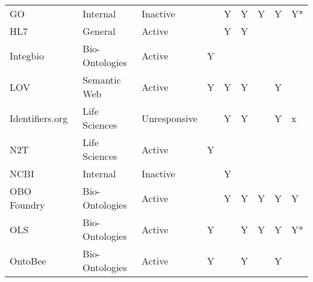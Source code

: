 \begin{table}
\begin{tabular}{lllllllll}
GO~\cite{TheGeneOntologyConsortium2019} &        Internal &     Inactive &                           &                      Y &                              Y &                      Y &                    Y &                     Y* \\
                  HL7~\cite{Bender2013} &         General &       Active &                           &                      Y &                              Y &                        &                      &                        \\
                               Integbio &  Bio-Ontologies &       Active &                         Y &                        &                                &                        &                      &                        \\
                                    LOV &    Semantic Web &       Active &                         Y &                      Y &                              Y &                        &                    Y &                        \\
        Identifiers.org~\cite{Juty2012} &   Life Sciences & Unresponsive &                           &                      Y &                              Y &                        &                    Y &                      x \\
             N2T~\cite{Wimalaratne2018} &   Life Sciences &       Active &                         Y &                        &                                &                        &                      &                        \\
                  NCBI~\cite{Clark2016} &        Internal &     Inactive &                           &                      Y &                                &                        &                      &                        \\
         OBO Foundry~\cite{Jackson2021} &  Bio-Ontologies &       Active &                           &                      Y &                              Y &                      Y &                    Y &                      Y \\
                   OLS~\cite{Cote2006a} &  Bio-Ontologies &       Active &                         Y &                        &                              Y &                      Y &                    Y &                     Y* \\
                 OntoBee~\cite{Ong2017} &  Bio-Ontologies &       Active &                         Y &                        &                              Y &                        &                    Y &                        \\

\end{tabular}
\end{table}
